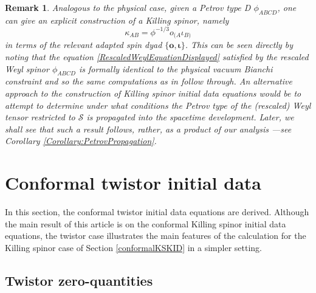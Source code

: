 \documentclass[10pt,a4paper]{article}
\theoremstyle{plain}
\newtheorem{remark}{Remark}
\def\bmo{{\bm o}}
\begin{document}
\begin{remark}{\em 
Analogous to the physical case, given a Petrov type D $\phi_{ABCD}$,
one can give an explicit construction of a Killing spinor, namely
\begin{equation*}
\kappa_{AB} = \phi^{-1/3}o_{(A}\iota_{B)}
\end{equation*}
in terms of the relevant adapted spin dyad $\lbrace \bmo,
\bm\iota\rbrace$. This can be seen directly by noting that the
equation \eqref{RescaledWeylEquationDisplayed} satisfied by the
rescaled Weyl spinor $\phi_{ABCD}$ is formally identical to the
physical vacuum Bianchi constraint and so the same computations as in
\cite{WalkerPenrose70} follow through.  An alternative approach to the
construction of Killing spinor initial data equations would be to
attempt to determine under what conditions the Petrov type of the
(rescaled) Weyl tensor restricted to $\mathcal{S}$ is propagated into
the spacetime development. Later, we shall see that such a result
follows, rather, as a \emph{product} of our analysis ---see Corollary
\ref{Corollary:PetrovPropagation}.}\label{Remark:DyadExpressionForKillingSpinorInTypeD}
\end{remark}

  \section{Conformal twistor initial data}
  \label{conformalTwistorKID}
  In this section, the conformal twistor initial data equations are
  derived.  Although the main result of this article is on the
  conformal  Killing spinor initial data equations, the twistor case
    illustrates the main features of the calculation for the Killing
  spinor case of Section \ref{conformalKSKID} in a simpler setting.
\subsection{Twistor zero-quantities}
\label{Sec:TwistorZeroQuantities}
\end{document}
